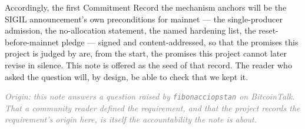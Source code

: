 \documentclass[10pt,a4paper]{article}
\begin{document}
Accordingly, the first Commitment Record the mechanism anchors will be the SIGIL
announcement's own preconditions for mainnet --- the single-producer admission, the
no-allocation statement, the named hardening list, the reset-before-mainnet pledge ---
signed and content-addressed, so that the promises this project is judged by are, from
the start, the promises this project cannot later revise in silence. This note is
offered as the seed of that record. The reader who asked the question will, by design,
be able to check that we kept it.

\vspace{8pt}
\begin{center}\small\itshape\textcolor{gray}{%
Origin: this note answers a question raised by \texttt{fibonacciopstan} on
BitcoinTalk. That a community reader defined the requirement, and that the project
records the requirement's origin here, is itself the accountability the note is about.}
\end{center}
\end{document}

